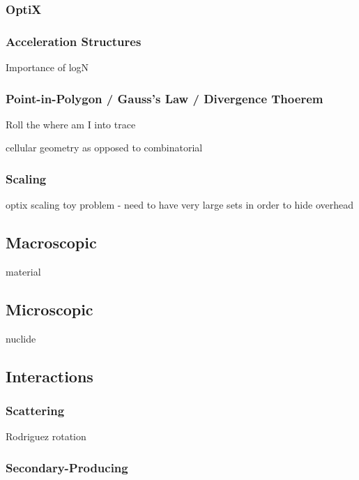 \subsubsection{OptiX}

\subsubsection{Acceleration Structures}

Importance of logN


\subsubsection{Point-in-Polygon / Gauss's Law / Divergence Thoerem}

Roll the where am I into  trace

cellular geometry as opposed to combinatorial


\subsubsection{Scaling}

optix scaling toy problem - need to have very large sets in order to hide overhead


\subsection{Macroscopic}

material

\subsection{Microscopic}

nuclide

\subsection{Interactions}

\subsubsection{Scattering}

Rodriguez rotation

\subsubsection{Secondary-Producing}

